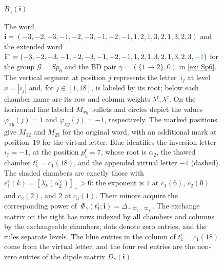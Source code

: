 \documentclass[a4paper]{amsart}
\numberwithin{equation}{section}
\theoremstyle{definition}
\theoremstyle{remark}
\newcommand{\mcG}{\mathcal{G}}
\newcommand{\bfi}{\mathbf{i}}
\newcommand{\rr}{\mathrm{r}}
\newcommand{\cc}{\mathrm{c}}
\begin{document}
\begin{example}
{\begin{landscape}
\begin{figure}[p]
{\begin{tikzpicture}[x=1.18cm,y=1.45cm]
          \end{tikzpicture}%
        }
      \endgroup
      \par\medskip
      \begin{minipage}[c]{.63\linewidth}
        \setlength{\captionindent}{0pt}
        \setlength{\abovecaptionskip}{0pt}
        \caption[The BD word seed for the $Sp_6$ example]{%
          The word $\bfi=(-3,-2,-3,-1,-2,-3,-1,-2,-1,1,2,1,3,2,1,3,2,3)$ and the extended word $\bfi^\gamma=(-3,-2,-3,-1,-2,-3,-1,-2,-1,1,2,1,3,2,1,3,2,3,\textcolor{accent}{-1})$ for the group $\mcG=Sp_6$ and the BD pair $\gamma=(\{1\to2\},0)$ in \cref{ex: Sp6}.
          The vertical segment at position $j$ represents the letter~$i_j$ at level $x=|i_j|$ and, for $j\in[1,18]$, is labeled by its root; below each chamber name are its row and column weights $\lambda^\rr,\lambda^\cc$.
          On the horizontal line labeled $M_{xy}$ bullets and circles depict the values~$\varphi_{xy}(j)=1$ and $\varphi_{xy}(j)=-1$, respectively.
          The marked positions give $M_{12}$ and $M_{23}$ for the original word, with an additional mark at position~$19$ for the virtual letter.
          Blue identifies the inversion letter $i_7=-1$, at the position $p^\rr_1=7$, whose root is $\alpha_2$, the thawed chamber $t^\rr_1=c_1(18)$, and the appended virtual letter $-1$ (dashed).
          The shaded chambers are exactly those with $e^\rr_1(k)=[\lambda^\rr_k(\alpha_2^\vee)]_+>0$: the exponent is $1$ at $c_1(6)$, $c_2(0)$ and $c_2(2)$, and $2$ at $c_3(1)$.
          Their minors acquire the corresponding power of~$\Phi_\gamma(t^\rr_1;\bfi)=\Delta_{-\varpi_1,\varpi_1}$.
          The exchange matrix on the right has rows indexed by all chambers and columns by the exchangeable chambers; dots denote zero entries, and the rules separate levels.
          The blue entries in the column of $t^\rr_1=c_1(18)$ come from the virtual letter, and the four red entries are the non-zero entries of the dipole matrix $D_\gamma(\bfi)$.}
        \label{fig: Sp6 word seed}
      \end{minipage}\hfill
      \begin{minipage}[c]{.34\linewidth}
        \begingroup
          \centering
          {\small $\widetilde B_\gamma(\mathbf i)$}\par\smallskip
          \setlength{\arraycolsep}{1.5pt}
          \renewcommand{\arraystretch}{.75}
\end{minipage}
\end{figure}
\end{landscape}}
\end{example}
\end{document}

